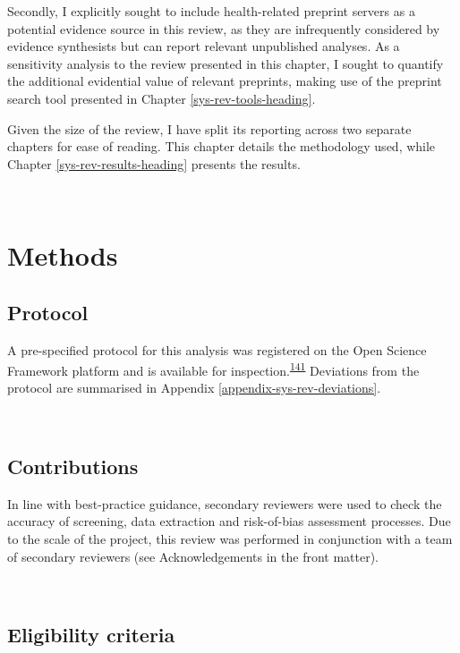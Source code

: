 \documentclass[a4paper, twoside]{templates/ociamthesis}
\begin{document}
Secondly, I explicitly sought to include health-related preprint servers as a potential evidence source in this review, as they are infrequently considered by evidence synthesists but can report relevant unpublished analyses. As a sensitivity analysis to the review presented in this chapter, I sought to quantify the additional evidential value of relevant preprints, making use of the preprint search tool presented in Chapter \ref{sys-rev-tools-heading}.

Given the size of the review, I have split its reporting across two separate chapters for ease of reading. This chapter details the methodology used, while Chapter \ref{sys-rev-results-heading} presents the results.

~

\hypertarget{methods}{%
\section{Methods}\label{methods}}

\hypertarget{protocol}{%
\subsection{Protocol}\label{protocol}}

A pre-specified protocol for this analysis was registered on the Open Science Framework platform and is available for inspection.\textsuperscript{\protect\hyperlink{ref-mcguinnessluke2020}{141}} Deviations from the protocol are summarised in Appendix \ref{appendix-sys-rev-deviations}.

~

\hypertarget{contributions}{%
\subsection{Contributions}\label{contributions}}

In line with best-practice guidance, secondary reviewers were used to check the accuracy of screening, data extraction and risk-of-bias assessment processes. Due to the scale of the project, this review was performed in conjunction with a team of secondary reviewers (see Acknowledgements in the front matter).

~

\hypertarget{eligibility-criteria}{%
\subsection{Eligibility criteria}\label{eligibility-criteria}}
\end{document}
